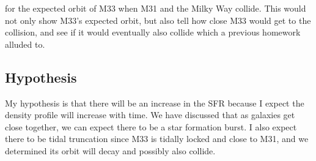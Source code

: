 \documentclass[10pt]{extarticle}
\begin{document}
for the expected orbit of M33 when M31 and the Milky Way collide. This would not only show M33's expected orbit, but also tell how close M33 would get to the collision, and see if it would eventually also collide which a previous homework alluded to. 


\subsection{Hypothesis}
My hypothesis is that there will be an increase in the SFR because I expect the density profile will increase with time. We have discussed that as galaxies get close together, we can expect there to be a star formation burst. I also expect there to be tidal truncation since M33 is tidally locked and close to M31, and we determined its orbit will decay and possibly also collide. 



\end{document}
